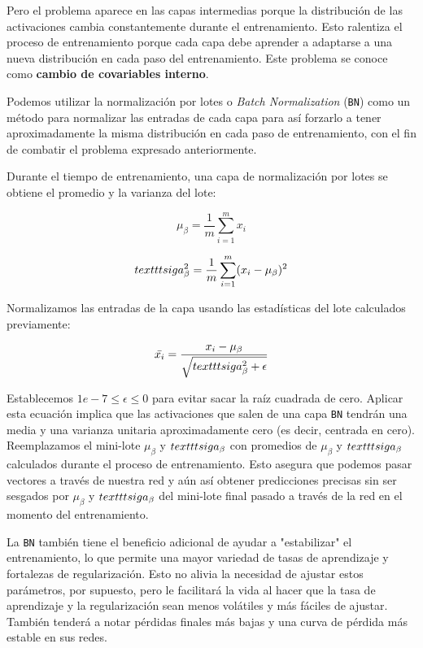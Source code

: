 \documentclass[a4paper,12pt]{article}
\begin{document}
Pero el problema aparece en las capas intermedias porque la distribución de las activaciones cambia constantemente durante el entrenamiento. Esto ralentiza el proceso de entrenamiento porque cada capa debe aprender a adaptarse a una nueva distribución en cada paso del entrenamiento. Este problema se conoce como \textbf{cambio de covariables interno}.

Podemos utilizar la normalización por lotes o \textit{Batch Normalization} (\texttt{BN}) como un método para normalizar las entradas de cada capa para así forzarlo a tener aproximadamente la misma distribución en cada paso de entrenamiento, con el fin de combatir el problema expresado anteriormente.

Durante el tiempo de entrenamiento, una capa de normalización por lotes se obtiene el promedio y la varianza del lote:

$$ \mu_{\beta} = \frac{1}{m} \sum_{i=1}^m x_i $$

$$ \\texttt{sig}a_{\beta}^2 = \frac{1}{m}  \sum_{i=1}^m (x_i - \mu_{\beta} ) ^2$$

Normalizamos las entradas de la capa usando las estadísticas del lote calculados previamente:

$$ \bar{x_i} = \frac{x_i - \mu_{\beta}}{\sqrt{\\texttt{sig}a_{\beta}^2+\epsilon}} $$



Establecemos $1e-7 \leq \epsilon \leq 0$ para evitar sacar la raíz cuadrada de cero. Aplicar esta ecuación implica que las activaciones que salen de una capa \texttt{BN} tendrán una media y una varianza unitaria aproximadamente cero (es decir, centrada en cero).
Reemplazamos el mini-lote $\mu_{\beta}$ y $\\texttt{sig}a_{\beta}$ con promedios de $\mu_{\beta}$ y $\\texttt{sig}a_{\beta}$ calculados durante el proceso de entrenamiento. Esto asegura que podemos pasar vectores a través de nuestra red y aún así obtener predicciones precisas sin ser sesgados por $\mu_{\beta}$ y $\\texttt{sig}a_{\beta}$ del mini-lote final pasado a través de la red en el momento del entrenamiento. 

La \texttt{BN} también tiene el beneficio adicional de ayudar a "estabilizar" el entrenamiento, lo que permite una mayor variedad de tasas de aprendizaje y fortalezas de regularización. Esto no alivia la necesidad de ajustar estos parámetros, por supuesto, pero le facilitará la vida al hacer que la tasa de aprendizaje y la regularización sean menos volátiles y más fáciles de ajustar. También tenderá a notar pérdidas finales más bajas y una curva de pérdida más estable en sus redes.
\end{document}
